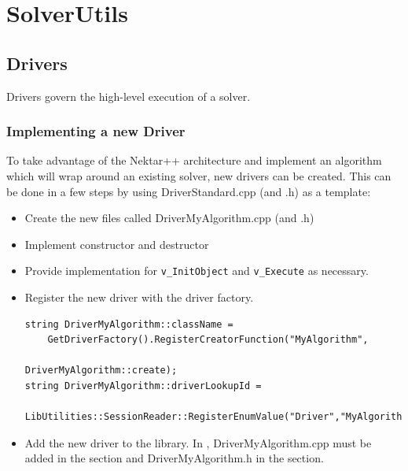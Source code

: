 \section{SolverUtils}

\subsection{Drivers}
Drivers govern the high-level execution of a solver.

\subsubsection{Implementing a new Driver}
To take advantage of the Nektar++ architecture and implement an algorithm 
which will wrap around an existing solver, new drivers can be created. This can
be done in a few steps by using DriverStandard.cpp (and .h) as a template:
\begin{itemize}
\item Create the new files called DriverMyAlgorithm.cpp (and .h)
\item Implement constructor and destructor
\item Provide implementation for \texttt{v\_InitObject} and \texttt{v\_Execute}
as necessary.
\item Register the new driver with the driver factory.
\begin{lstlisting}[style=C++Style]
string DriverMyAlgorithm::className = 
    GetDriverFactory().RegisterCreatorFunction("MyAlgorithm",
                                               DriverMyAlgorithm::create); 
string DriverMyAlgorithm::driverLookupId = 
    LibUtilities::SessionReader::RegisterEnumValue("Driver","MyAlgorithm",0);
\end{lstlisting}
\item Add the new driver to the library. In , 
DriverMyAlgorithm.cpp must be added in the  
section and DriverMyAlgorithm.h in the  section.
\end{itemize}
